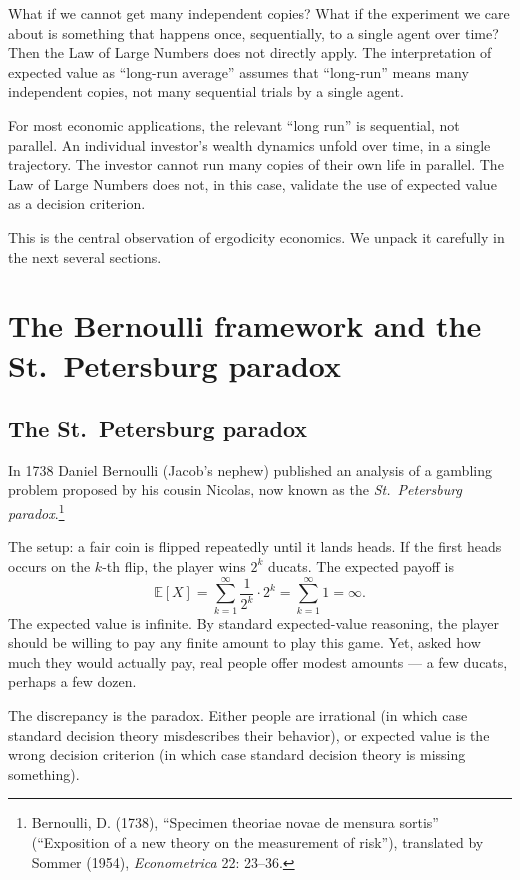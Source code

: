 What if we cannot get many independent copies? What if the
experiment we care about is something that happens once, sequentially,
to a single agent over time? Then the Law of Large Numbers does not
directly apply. The interpretation of expected value as ``long-run
average'' assumes that ``long-run'' means many independent copies, not
many sequential trials by a single agent.

For most economic applications, the relevant ``long run'' is
sequential, not parallel. An individual investor's wealth dynamics
unfold over time, in a single trajectory. The investor cannot run
many copies of their own life in parallel. The Law of Large Numbers
does not, in this case, validate the use of expected value as a
decision criterion.

This is the central observation of ergodicity economics. We unpack
it carefully in the next several sections.

\section{The Bernoulli framework and the St.\ Petersburg paradox}
\label{sec:bernoulli-puzzle}

\subsection{The St.\ Petersburg paradox}

In 1738 Daniel Bernoulli (Jacob's nephew) published an analysis of a
gambling problem proposed by his cousin Nicolas, now known as the
\emph{St.\ Petersburg paradox}.\footnote{Bernoulli, D. (1738),
``Specimen theoriae novae de mensura sortis'' (``Exposition of a new
theory on the measurement of risk''), translated by Sommer (1954),
\emph{Econometrica} 22: 23--36.}

The setup: a fair coin is flipped repeatedly until it lands heads.
If the first heads occurs on the $k$-th flip, the player wins
$2^k$ ducats. The expected payoff is
\[
    \mathbb{E}[X] = \sum_{k=1}^\infty \frac{1}{2^k} \cdot 2^k =
    \sum_{k=1}^\infty 1 = \infty.
\]
The expected value is infinite. By standard expected-value
reasoning, the player should be willing to pay any finite amount to
play this game. Yet, asked how much they would actually pay, real
people offer modest amounts --- a few ducats, perhaps a few dozen.

The discrepancy is the paradox. Either people are irrational (in
which case standard decision theory misdescribes their behavior), or
expected value is the wrong decision criterion (in which case
standard decision theory is missing something).

